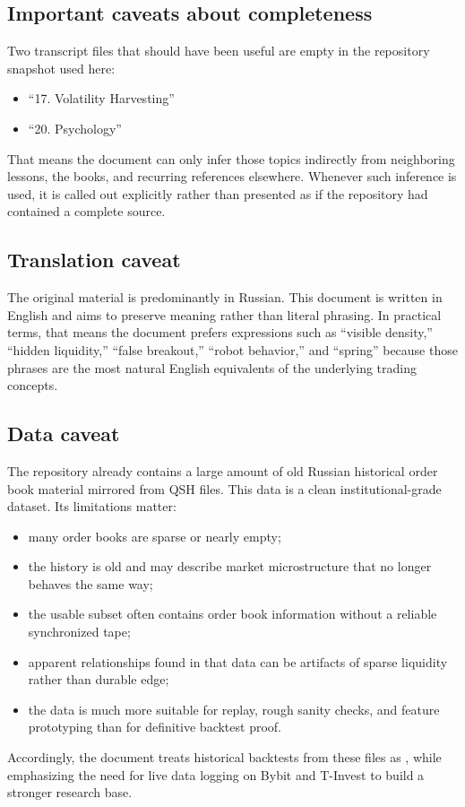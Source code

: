 \subsection{Important caveats about completeness}

Two transcript files that should have been useful are empty in the repository snapshot used here:

\begin{itemize}[leftmargin=1.5em]
\item ``17. Volatility Harvesting''
\item ``20. Psychology''
\end{itemize}

That means the document can only infer those topics indirectly from neighboring lessons, the books, and recurring references elsewhere. Whenever such inference is used, it is called out explicitly rather than presented as if the repository had contained a complete source.

\subsection{Translation caveat}

The original material is predominantly in Russian. This document is written in English and aims to preserve meaning rather than literal phrasing. In practical terms, that means the document prefers expressions such as ``visible density,'' ``hidden liquidity,'' ``false breakout,'' ``robot behavior,'' and ``spring'' because those phrases are the most natural English equivalents of the underlying trading concepts.

\subsection{Data caveat}

The repository already contains a large amount of old Russian historical order book material mirrored from QSH files. This data is  a clean institutional-grade dataset. Its limitations matter:

\begin{itemize}[leftmargin=1.5em]
\item many order books are sparse or nearly empty;
\item the history is old and may describe market microstructure that no longer behaves the same way;
\item the usable subset often contains order book information without a reliable synchronized tape;
\item apparent relationships found in that data can be artifacts of sparse liquidity rather than durable edge;
\item the data is much more suitable for replay, rough sanity checks, and feature prototyping than for definitive backtest proof.
\end{itemize}

Accordingly, the document treats historical backtests from these files as , while emphasizing the need for live data logging on Bybit and T-Invest to build a stronger research base.
